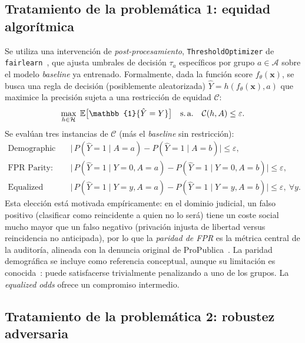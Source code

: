 \documentclass[11pt,a4paper]{article}
\begin{document}
\subsection{Tratamiento de la problemática 1: equidad algorítmica}
\label{sec:metod_fairness}

Se utiliza una intervención de \emph{post-procesamiento}, \texttt{ThresholdOptimizer} de \texttt{fairlearn}~\cite{hardt2016equality, bird2020fairlearn}, que ajusta umbrales de decisión $\tau_a$ específicos por grupo $a\in\mathcal{A}$ sobre el modelo \textit{baseline} ya entrenado. Formalmente, dada la función score $f_\theta(\bm{x})$, se busca una regla de decisión (posiblemente aleatorizada) $\hat{Y}=h(f_\theta(\bm{x}),a)$ que maximice la precisión sujeta a una restricción de equidad $\mathcal{C}$:
\begin{equation}
    \max_{h\in\mathcal{H}}\;\mathbb{E}\bigl[\mathbb{1}\{\hat{Y}=Y\}\bigr]
    \quad\text{s.\,a.}\quad
    \mathcal{C}(h,A)\le\varepsilon.
    \label{eq:thoptim}
\end{equation}
Se evalúan tres instancias de $\mathcal{C}$ (más el \textit{baseline} sin restricción):
\begin{align}
    \text{Demographic Parity (DP):}\quad &
    \bigl|\,P(\hat{Y}{=}1\mid A{=}a)-P(\hat{Y}{=}1\mid A{=}b)\bigr| \le \varepsilon,
    \label{eq:dp}\\[2pt]
    \text{FPR Parity:}\quad &
    \bigl|\,P(\hat{Y}{=}1\mid Y{=}0, A{=}a)-P(\hat{Y}{=}1\mid Y{=}0, A{=}b)\bigr| \le \varepsilon,
    \label{eq:fpr}\\[2pt]
    \text{Equalized Odds (EO):}\quad &
    \bigl|\,P(\hat{Y}{=}1\mid Y{=}y, A{=}a)-P(\hat{Y}{=}1\mid Y{=}y, A{=}b)\bigr| \le \varepsilon, \ \forall y.
    \label{eq:eo}
\end{align}
Esta elección está motivada empíricamente: en el dominio judicial, un falso positivo (clasificar como reincidente a quien no lo será) tiene un coste social mucho mayor que un falso negativo (privación injusta de libertad versus reincidencia no anticipada), por lo que la \emph{paridad de FPR} es la métrica central de la auditoría, alineada con la denuncia original de ProPublica~\cite{angwin2016machine}. La paridad demográfica se incluye como referencia conceptual, aunque su limitación es conocida~\cite{dwork2012fairness}: puede satisfacerse trivialmente penalizando a uno de los grupos. La \textit{equalized odds} ofrece un compromiso intermedio.

\subsection{Tratamiento de la problemática 2: robustez adversaria}
\end{document}
